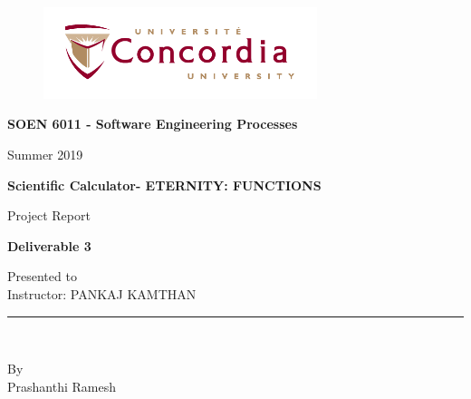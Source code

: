 \documentclass[11pt, english]{report}
\begin{document}
\begin{titlepage}

\begin{center}
\vspace*{-1in}
\begin{figure}[htb]
\begin{center}
\includegraphics[width=8cm]{logo}
\end{center}
\end{figure}
\begin{Large}
\textbf{SOEN 6011 - Software Engineering Processes} \\
\end{Large}
\vspace*{0.1in}
Summer 2019\\
\vspace*{0.5in}
\begin{Large}
\textbf{Scientific Calculator-  ETERNITY: FUNCTIONS} \\
\end{Large}
\vspace*{0.4in}
\begin{large}
Project Report\\
\end{large}
\vspace*{0.2in}
\begin{Large}
\textbf{Deliverable 3} \\
\end{Large}
\vspace*{0.3in}
\begin{large}
Presented to \\
\vspace*{0.1in}
Instructor: PANKAJ KAMTHAN 
 \\
\end{large}
\vspace*{0.3in}
\rule{80mm}{0.1mm}\\
\vspace*{0.1in}
\begin{large}
By \\
Prashanthi Ramesh\\ 
\vspace*{0.3in}
\date{\normalsize\today} 

\end{large}
\end{center}
\end{titlepage}
\end{document}
